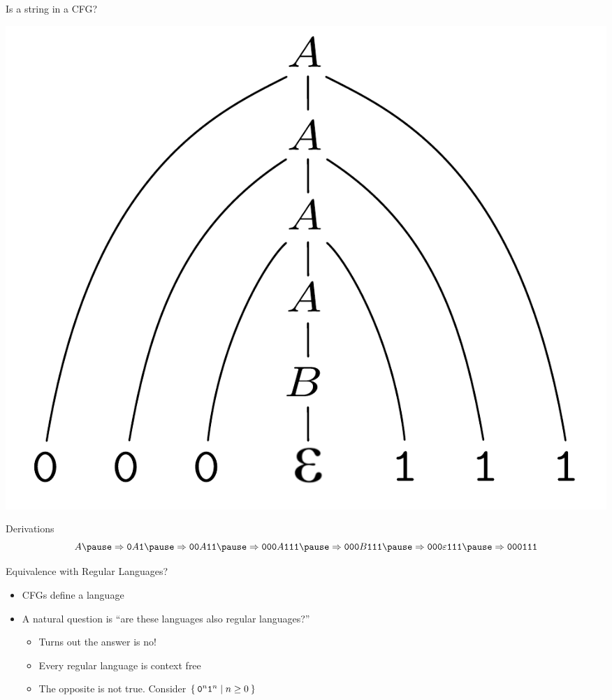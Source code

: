 \documentclass[aspectratio=169]{beamer}
\begin{document}
\begin{frame}{Is a string in a CFG?}
    \begin{center}
        \includegraphics[scale=0.33]{CFG_tree.png}
    \end{center}
\end{frame}

\begin{frame}{Derivations}
    $$
        A \pause\Rightarrow \texttt{0}A\texttt{1} \pause\Rightarrow \texttt{00}A\texttt{11} \pause\Rightarrow \texttt{000}A\texttt{111} \pause\Rightarrow \texttt{000}B\texttt{111} \pause\Rightarrow \texttt{000}\varepsilon\texttt{111} \pause\Rightarrow \texttt{000}\texttt{111}
    $$
\end{frame}

\begin{frame}{Equivalence with Regular Languages?}
    \begin{itemize}
        \item CFGs define a language \pause
        \item A natural question is ``are these languages also regular languages?'' \pause
        \begin{itemize}
            \item Turns out the answer is no! \pause
            \item Every regular language is context free \pause
            \item The opposite is not true. Consider $\Set{\texttt{0}^n\texttt{1}^n | n \geq 0}$
        \end{itemize}
    \end{itemize}
\end{frame}
\end{document}
